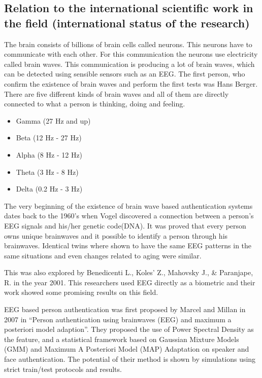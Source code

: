 \documentclass[a4paper,11pt]{article}
\begin{document}
\subsection{Relation to the international scientific work in the field (international status of the research)}
The brain consists of billions of brain cells called neurons. This neurons have to communicate with each other. For this communication the neurons use electricity called brain waves. This communication is producing a lot of brain waves, which can be detected using sensible sensors such as an EEG. The first person, who confirm the existence of brain waves and perform the first tests was Hans Berger. There are five different kinds of brain waves and all of them are directly connected to what a person is thinking, doing and feeling.

\begin{itemize}
 \item Gamma (27 Hz and up)
 \item Beta (12 Hz - 27 Hz)
 \item Alpha (8 Hz - 12 Hz)
 \item Theta (3 Hz - 8 Hz)
 \item Delta (0.2 Hz - 3 Hz)
\end{itemize}

The very beginning of the existence of brain wave based authentication systems dates back to the 1960's when Vogel discovered a connection between a person's EEG signals and his/her genetic code(DNA). It was proved that every person owns unique brainwaves and it possible to identify a person through his brainwaves. Identical twins where shown to have the same EEG patterns in the same situations and even changes related to aging were similar. 


This was also explored by Benedicenti L., Koles’ Z., Mahovsky J., \& Paranjape, R. in the year 2001. This researchers used EEG directly as a biometric and their work showed some promising results on this field.


EEG based person authentication was first proposed by Marcel and Millan in 2007 in “Person authentication using brainwaves (EEG) and maximum a posteriori model adaption”. They proposed the use of  Power Spectral Density as the feature, and a statistical framework based on Gaussian Mixture  Models (GMM) and Maximum A Posteriori Model (MAP) Adaptation on speaker and face  authentication. The potential of their method is shown by simulations using strict train/test protocols and results. 
\end{document}
